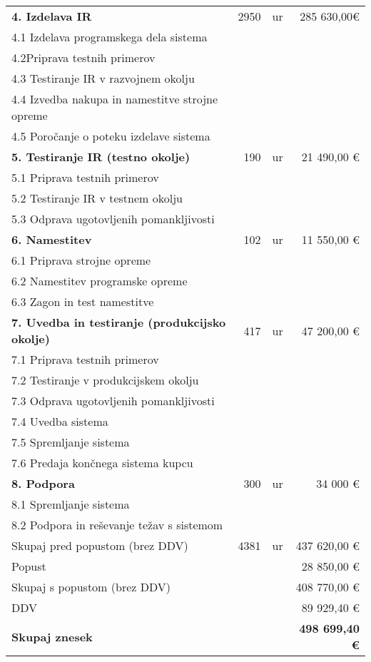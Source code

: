 \documentclass{invoice} %
\def \tab {\hspace*{3ex}} %
\begin{document}
\begin{center}
\begin{longtable}{@{\extracolsep{\fill}\hspace{\tabcolsep}} l r r r }
        \textbf{4. Izdelava IR} & 2950 & ur & 285 630,00\euro\\
            \tab4.1 Izdelava programskega dela sistema\\
            \tab4.2Priprava testnih primerov\\
            \tab4.3 Testiranje IR v razvojnem okolju\\
            \tab4.4 Izvedba nakupa in namestitve strojne opreme\\
            \tab4.5 Poročanje o poteku izdelave sistema\\

        \textbf{5. Testiranje IR (testno okolje)} & 190 & ur & 21 490,00 \euro\\
            \tab5.1 Priprava testnih primerov\\
            \tab5.2 Testiranje IR v testnem okolju\\
            \tab5.3 Odprava ugotovljenih pomankljivosti\\

        \textbf{6. Namestitev} & 102 & ur & 11 550,00 \euro\\
            \tab6.1 Priprava strojne opreme\\
            \tab6.2 Namestitev programske opreme\\
            \tab6.3 Zagon in test namestitve\\
        
        \textbf{7. Uvedba in testiranje (produkcijsko okolje)} & 417 & ur & 47 200,00 \euro\\
            \tab7.1 Priprava testnih primerov\\
            \tab7.2 Testiranje v produkcijskem okolju\\
            \tab7.3 Odprava ugotovljenih pomankljivosti\\
            \tab7.4 Uvedba sistema\\
            \tab7.5 Spremljanje sistema\\
            \tab7.6 Predaja končnega sistema kupcu\\
            
        \textbf{8. Podpora} & 300 & ur & 34 000 \euro\\
            \tab8.1 Spremljanje sistema\\
            \tab8.2 Podpora in reševanje težav s sistemom\\
        \hline
        Skupaj pred popustom (brez DDV) & 4381 & ur & 437 620,00 \euro\\
            \tab Popust & & & 28 850,00 \euro\\
        Skupaj s popustom (brez DDV) & & & 408 770,00 \euro\\
            \tab DDV & & & 89 929,40 \euro\\
        \hline\hline
        \textbf{Skupaj znesek} & & & \textbf{498 699,40 \euro}

    \end{longtable}
\end{center}
\end{document}
